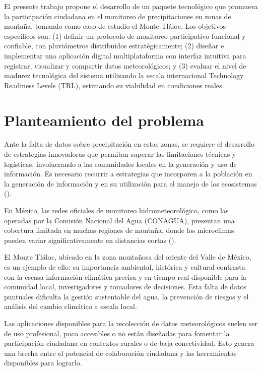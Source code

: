 El presente trabajo propone el desarrollo de un paquete tecnológico que promueva la participación ciudadana en el monitoreo de precipitaciones en zonas de montaña, tomando como caso de estudio el Monte Tláloc. Los objetivos específicos son: (1) definir un protocolo de monitoreo participativo funcional y confiable, con pluviómetros distribuidos estratégicamente; (2) diseñar e implementar una aplicación digital multiplataforma con interfaz intuitiva para registrar, visualizar y compartir datos meteorológicos; y (3) evaluar el nivel de madurez tecnológica del sistema utilizando la escala internacional Technology Readiness Levels (TRL), estimando su viabilidad en condiciones reales.


\section{Planteamiento del problema}

Ante la falta de datos sobre precipitación en estas zonas, se requiere el desarrollo de estrategias innovadoras que permitan superar las limitaciones técnicas y logísticas, involucrando a las comunidades locales en la generación y uso de información. Es necesario recurrir a estrategias que incorporen a la población en la generación de información y en su utilización para el manejo de los ecosistemas (\cite{hubp1990}).


En México, las redes oficiales de monitoreo hidrometeorológico, como las operadas por la Comisión Nacional del Agua (CONAGUA), presentan una cobertura limitada en muchas regiones de montaña, donde los microclimas pueden variar significativamente en distancias cortas (\cite{rosas2021}).


El Monte Tláloc, ubicado en la zona montañosa del oriente del Valle de México, es un ejemplo de ello: su importancia ambiental, histórica y cultural contrasta con la escasa información climática precisa y en tiempo real disponible para la comunidad local, investigadores y tomadores de decisiones. Esta falta de datos puntuales dificulta la gestión sustentable del agua, la prevención de riesgos y el análisis del cambio climático a escala local.

Las aplicaciones disponibles para la recolección de datos meteorológicos suelen ser de uso profesional, poco accesibles o no están diseñadas para fomentar la participación ciudadana en contextos rurales o de baja conectividad. Esto genera una brecha entre el potencial de colaboración ciudadana y las herramientas disponibles para lograrlo.

